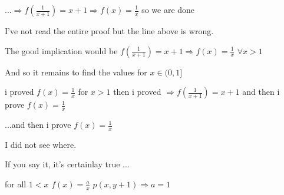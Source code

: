 \begin{solution}
	\begin{tcolorbox}...$\Rightarrow f(\frac{1}{x+1})=x+1\Rightarrow f(x)=\frac{1}{x}$ 
so we are done\end{tcolorbox}I've not read the entire proof but the line above is wrong.

The good implication would be $f(\frac{1}{x+1})=x+1\Rightarrow f(x)=\frac{1}{x}$ $\boxed{\forall x>1}$ 

And so it remains to find the values for $x\in(0,1]$
\end{solution}



\begin{solution}
	i proved $ f(x)=\frac{1}{x}  $ for $x>1$
 then i proved $\Rightarrow f(\frac{1}{x+1})=x+1$ and then i prove $f(x)=\frac{1}{x}$
\end{solution}



\begin{solution}
	\begin{tcolorbox}...and then i prove $f(x)=\frac{1}{x}$\end{tcolorbox}
I did not see where.

If you say it, it's certainlay true ...
\end{solution}



\begin{solution}
	\begin{tcolorbox} for all $1<x$ $f(x)=\frac{a}{x}$
$p(x,y+1)\Rightarrow a=1$ 
 \end{tcolorbox}
\end{solution}



